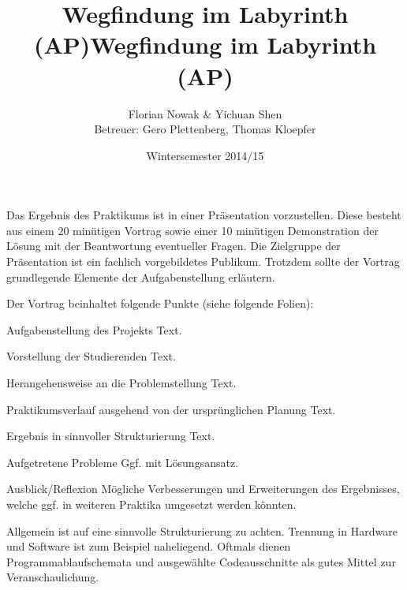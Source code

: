 \documentclass{beamer}
\title{Wegfindung im Labyrinth (AP)}
\title{Wegfindung im Labyrinth (AP)}
\author{\texorpdfstring{Florian Nowak \& Yichuan Shen\\ Betreuer: Gero Plettenberg, Thomas Kloepfer}{Florian Nowak \& Yichuan Shen}}
\date{Wintersemester 2014/15}
\begin{document}
\maketitle

\begin{frame}[fragile,t]{}
Das Ergebnis des Praktikums ist in einer Präsentation vorzustellen. Diese besteht aus einem 20 minütigen Vortrag sowie einer 10 minütigen Demonstration der Lösung mit der Beantwortung eventueller Fragen. Die Zielgruppe der Präsentation ist ein fachlich vorgebildetes Publikum. Trotzdem sollte der Vortrag grundlegende Elemente der Aufgabenstellung erläutern.

\medskip\noindent
Der Vortrag beinhaltet folgende Punkte (siehe folgende Folien):
\end{frame}

\begin{frame}[fragile,t]{Aufgabenstellung des Projekts}
Text.
\end{frame}

\begin{frame}[fragile,t]{Vorstellung der Studierenden}
Text.
\end{frame}

\begin{frame}[fragile,t]{Herangehensweise an die Problemstellung}
Text.
\end{frame}

\begin{frame}[fragile,t]{Praktikumsverlauf ausgehend von der ursprünglichen Planung}
Text.
\end{frame}

\begin{frame}[fragile,t]{Ergebnis in sinnvoller Strukturierung}
Text.
\end{frame}

\begin{frame}[fragile,t]{Aufgetretene Probleme}
Ggf. mit Lösungsansatz.
\end{frame}

\begin{frame}[fragile,t]{Ausblick/Reflexion}
Mögliche Verbesserungen und Erweiterungen des Ergebnisses, welche ggf. in weiteren Praktika umgesetzt werden könnten.
\end{frame}

\begin{frame}[fragile,t]{}
Allgemein ist auf eine sinnvolle Strukturierung zu achten. Trennung in Hardware und Software ist zum Beispiel naheliegend. Oftmals dienen Programmablaufschemata und ausgewählte Codeausschnitte als gutes Mittel zur Veranschaulichung.
\end{frame}


\end{document}
